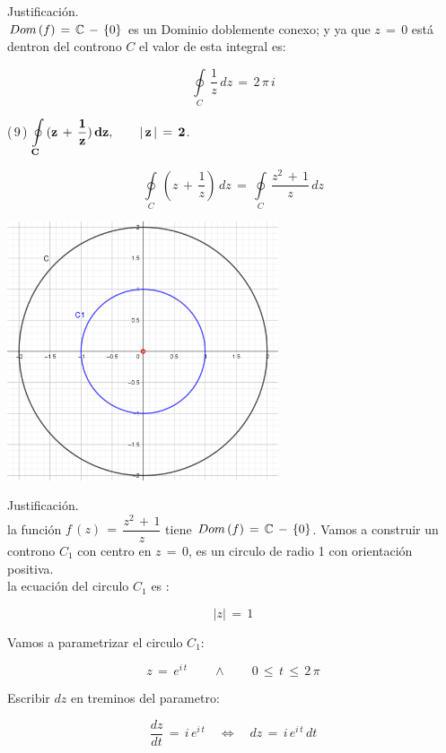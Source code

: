 \documentclass[a4paper,11pt,openany]{book}
\begin{document}
\textcolor{ao(english)}{} Justificación.\\

$\mathnormal{Dom\,(f)}\,=\,\mathbb C\,-\,\{0\}$ es un Dominio doblemente conexo; y ya que $z\,=\,0$ está dentron del controno $C$ el valor de esta integral es:

$$\displaystyle\oint\limits_{C}\,\dfrac{1}{z}\,dz\,=\,2\,\pi\,i$$

\textcolor{ao(english)}{(\,9\,)} $\bf{\displaystyle\oint\limits_{C}\,(z\,+\,\dfrac{1}{z})\,dz}, \qquad |\,z\,|\,=\,2$.

$$\displaystyle\oint\limits_{C}\,(z\,+\,\dfrac{1}{z})\,dz\,=\,\displaystyle\oint\limits_{C}\,\dfrac{z^{2}\,+\,1}{z}\,dz$$

\begin{center}
     \includegraphics[width=8cm]{Gra-Ej-9.png}
\end{center}

\textcolor{ao(english)}{} Justificación.\\

la función $f\,(z)\,=\,\dfrac{z^{2}\,+\,1}{z}$ tiene $\mathnormal{Dom\,(f)}\,=\,\mathbb C\,-\,\{0\}$.  Vamos a construir un controno $C_{1}$ con centro en $z\,=\,0$, es un circulo de radio 1 con orientación positiva.\\

la ecuación del circulo $C_{1}$ es :

$$|z|\,=\,1$$

Vamos a parametrizar el circulo $C_{1}$:

$$z\,=\,e^{i\,t} \qquad\wedge\qquad 0\,\leq\,t\,\leq\,2\,\pi$$

Escribir $dz$ en treminos del parametro:

$$\dfrac{dz}{dt}\,=\,i\,e^{i\,t} \quad\iff\quad dz\,=\,i\,e^{i\,t}\,dt$$
\end{document}
